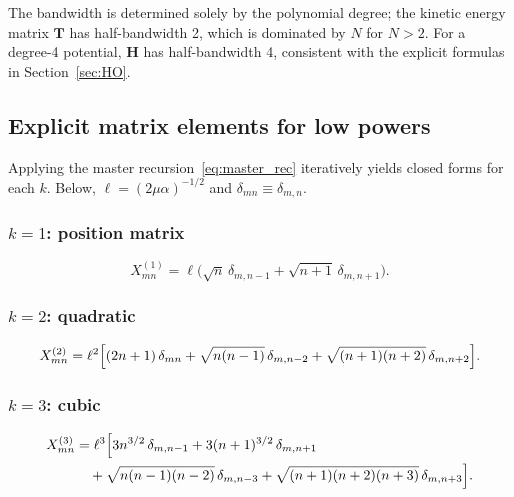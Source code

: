 The bandwidth is determined solely by the polynomial degree; the kinetic
energy matrix $\mathbf{T}$ has half-bandwidth 2, which is dominated by $N$
for $N>2$.  For a degree-4 potential, $\mathbf{H}$ has half-bandwidth 4,
consistent with the explicit formulas in Section~\ref{sec:HO}.

\subsection{Explicit matrix elements for low powers}\label{sec:explicit_Xk}

Applying the master recursion~\eqref{eq:master_rec} iteratively yields closed
forms for each $k$.  Below, $\ell=(2\mu\alpha)^{-1/2}$ and
$\delta_{mn}\equiv\delta_{m,n}$.

\subsubsection{\texorpdfstring{$k=1$}{k=1}: position matrix}

\begin{equation}\label{eq:X1}
  X^{(1)}_{mn}
  = \ell\bigl(\sqrt{n}\,\delta_{m,n-1} + \sqrt{n+1}\,\delta_{m,n+1}\bigr).
\end{equation}

\subsubsection{\texorpdfstring{$k=2$}{k=2}: quadratic}

\begin{equation}\label{eq:X2}
  X^{(2)}_{mn}
  = \ell^2\Bigl[(2n+1)\,\delta_{mn}
    + \sqrt{n(n-1)}\,\delta_{m,n-2}
    + \sqrt{(n+1)(n+2)}\,\delta_{m,n+2}\Bigr].
\end{equation}

\subsubsection{\texorpdfstring{$k=3$}{k=3}: cubic}

\begin{align}\label{eq:X3}
  X^{(3)}_{mn}
  &= \ell^3\Bigl[3n^{3/2}\,\delta_{m,n-1}
               + 3(n+1)^{3/2}\,\delta_{m,n+1} \nonumber\\
  &\quad +\sqrt{n(n-1)(n-2)}\,\delta_{m,n-3}
    +\sqrt{(n+1)(n+2)(n+3)}\,\delta_{m,n+3}\Bigr].
\end{align}


